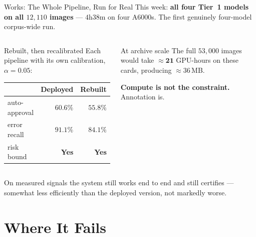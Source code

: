 \documentclass[aspectratio=169,11pt]{beamer}
\newcommand{\yes}{\textcolor{PrismGreen}{\textbf{Yes}}}
\begin{document}
\begin{frame}{Works: The Whole Pipeline, Run for Real}
\small
This week: \textbf{all four Tier~1 models on all $12{,}110$ images} --- $4$h$38$m on four A6000s. The first genuinely four-model corpus-wide run.
\vspace{1mm}
\begin{columns}[T]
\begin{block}{\small Rebuilt, then recalibrated}
\footnotesize Each pipeline with its own calibration, $\alpha=0.05$:
\vspace{1mm}
\begin{center}
\begin{tabular}{@{}l r r@{}}
& \textbf{Deployed} & \textbf{Rebuilt} \\
\midrule
auto-approval & $60.6\%$ & $55.8\%$ \\
error recall & $91.1\%$ & $84.1\%$ \\
risk bound & \yes & \yes \\
\end{tabular}
\end{center}
\end{block}

\begin{block}{\small At archive scale}
\footnotesize The full $53{,}000$ images would take $\approx\mathbf{21}$ GPU-hours on these cards, producing $\approx36$\,MB.
\vspace{1mm}

\textbf{Compute is not the constraint.} Annotation is.
\end{block}
\end{columns}
\vspace{1mm}
\footnotesize On measured signals the system still works end to end and still certifies --- somewhat less efficiently than the deployed version, not markedly worse.
\end{frame}

\section{Where It Fails}
\end{document}
